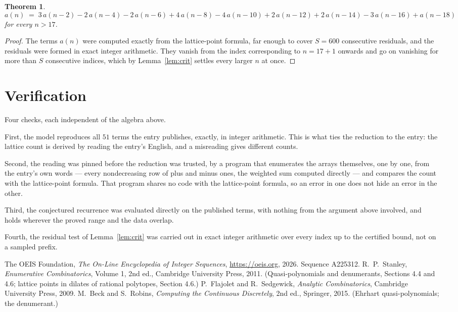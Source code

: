 \documentclass[11pt,a4paper]{article}
\theoremstyle{plain}
\newtheorem{theorem}{Theorem}
\theoremstyle{definition}
\begin{document}
\begin{theorem}
\[
a(n)\;=\;3\,a(n-2) - 2\,a(n-4) - 2\,a(n-6) + 4\,a(n-8) - 4\,a(n-10) + 2\,a(n-12) + 2\,a(n-14) - 3\,a(n-16) + a(n-18)
\]
for every $n>17$.
\end{theorem}

\begin{proof}
The terms $a(n)$ were computed exactly from the lattice-point formula, far enough to cover
$S=600$ consecutive residuals, and the residuals were formed in exact integer arithmetic.
They vanish from the index corresponding to $n=17+1$ onwards and go on vanishing for more
than $S$ consecutive indices, which by Lemma~\ref{lem:crit} settles every larger $n$ at
once.
\end{proof}

\section{Verification}

Four checks, each independent of the algebra above.

First, the model reproduces all $51$ terms the entry publishes, exactly, in integer
arithmetic. This is what ties the reduction to the entry: the lattice count is derived by reading the
entry's English, and a misreading gives different counts.

Second, the reading was pinned before the reduction was trusted, by a program that enumerates
the arrays themselves, one by one, from the entry's own words --- every nondecreasing
row of plus and minus ones, the weighted sum computed directly --- and compares the count
with the lattice-point formula. That program shares no code with the lattice-point formula, so an error in one does not
hide an error in the other.

Third, the conjectured recurrence was evaluated directly on the published terms, with
nothing from the argument above involved, and holds wherever the proved range and the data
overlap.

Fourth, the residual test of Lemma~\ref{lem:crit} was carried out in exact integer
arithmetic over every index up to the certified bound, not on a sampled prefix.

\begin{thebibliography}{9}
 The OEIS Foundation, \emph{The On-Line Encyclopedia of Integer
Sequences}, \url{https://oeis.org}, 2026. Sequence A225312.
 R.~P.~Stanley, \emph{Enumerative Combinatorics}, Volume 1, 2nd ed.,
Cambridge University Press, 2011. (Quasi-polynomials and denumerants, Sections 4.4 and 4.6;
lattice points in dilates of rational polytopes, Section 4.6.)
 P.~Flajolet and R.~Sedgewick, \emph{Analytic Combinatorics}, Cambridge
University Press, 2009.
 M.~Beck and S.~Robins, \emph{Computing the Continuous Discretely}, 2nd
ed., Springer, 2015. (Ehrhart quasi-polynomials; the denumerant.)
\end{thebibliography}
\end{document}
